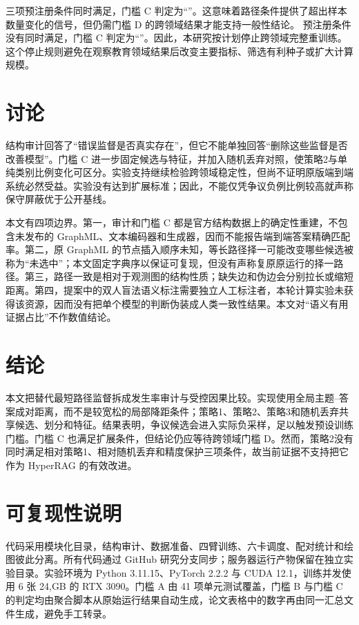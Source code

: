 \documentclass[UTF8,11pt]{ctexart}
\begin{document}
\ifgatecpassed
三项预注册条件同时满足，门槛 C 判定为“\GateCDecision”。这意味着路径条件提供了超出样本数量变化的信号，但仍需门槛 D 的跨领域结果才能支持一般性结论。
\else
预注册条件没有同时满足，门槛 C 判定为“\GateCDecision”。因此，本研究按计划停止跨领域完整重训练。这个停止规则避免在观察教育领域结果后改变主要指标、筛选有利种子或扩大计算规模。
\fi

\section{讨论}

结构审计回答了“错误监督是否真实存在”，但它不能单独回答“删除这些监督是否改善模型”。门槛 C 进一步固定候选与特征，并加入随机丢弃对照，使策略2与单纯类别比例变化可区分。\ifgatecpassed 实验支持继续检验跨领域稳定性，但尚不证明原版端到端系统必然受益。\else 实验没有达到扩展标准；因此，不能仅凭争议负例比例较高就声称保守屏蔽优于公开基线。\fi

本文有四项边界。第一，审计和门槛 C 都是官方结构数据上的确定性重建，不包含未发布的 GraphML、文本编码器和生成器，因而不能报告端到端答案精确匹配率。第二，原 GraphML 的节点插入顺序未知，等长路径择一可能改变哪些候选被称为“未选中”；本文固定字典序以保证可复现，但没有声称复原原运行的择一路径。第三，路径一致是相对于观测图的结构性质；缺失边和伪边会分别拉长或缩短距离。第四，提案中的双人盲法语义标注需要独立人工标注者，本轮计算实验未获得该资源，因而没有把单个模型的判断伪装成人类一致性结果。本文对“语义有用证据占比”不作数值结论。

\section{结论}

本文把替代最短路径监督拆成发生率审计与受控因果比较。实现使用全局主题--答案成对距离，而不是较宽松的局部降距条件；策略1、策略2、策略3和随机丢弃共享候选、划分和特征。结果表明，争议候选会进入实际负采样，足以触发预设训练门槛。\ifgatecpassed 门槛 C 也满足扩展条件，但结论仍应等待跨领域门槛 D。\else 然而，策略2没有同时满足相对策略1、相对随机丢弃和精度保护三项条件，故当前证据不支持把它作为 HyperRAG 的有效改进。\fi

\section*{可复现性说明}

代码采用模块化目录，结构审计、数据准备、四臂训练、六卡调度、配对统计和绘图彼此分离。所有代码通过 GitHub 研究分支同步；服务器运行产物保留在独立实验目录。实验环境为 Python 3.11.15、PyTorch 2.2.2 与 CUDA 12.1，训练并发使用 6 张 24,GB 的 RTX 3090。门槛 A 由 41 项单元测试覆盖，门槛 B 与门槛 C 的判定均由聚合脚本从原始运行结果自动生成，论文表格中的数字再由同一汇总文件生成，避免手工转录。

\begingroup
\footnotesize


\endgroup
\end{document}
